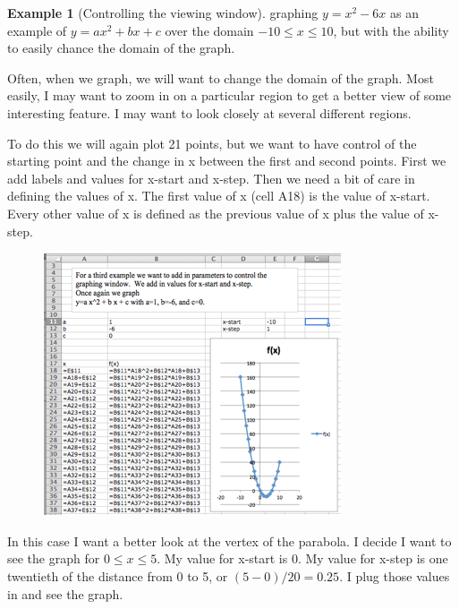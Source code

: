 \documentclass[10pt,]{book}
\theoremstyle{plain}
\theoremstyle{definition}
\newtheorem{example}[theorem]{Example}
\theoremstyle{definition}
\begin{document}
\begin{example}[Controlling the viewing window]\label{example-7}
 graphing \(y=x^2 - 6 x\) as an example of \(y = a x^2 + b x + c\) over the domain \(-10 \le x \le 10\), but with the ability to easily chance the domain of the graph.%
\par
Often, when we graph, we will want to change the domain of the graph.  Most easily, I may want to zoom in on a particular region to get a better view of some interesting feature.  I may want to look closely at several different regions.%
\par
To do this we will again plot 21 points, but we want to have control of the starting point and the change in x between the first and second points.  First we add labels and values for x-start and x-step.  Then we need a bit of care in defining the values of x.  The first value of x (cell A18) is the value of x-start.  Every other value of x is defined as the previous value of x plus the value of x-step.%
\leavevmode%
\begin{figure}
\centering
\includegraphics[width=0.8\linewidth]{images/sec1-4-8.png}
\end{figure}
\par
In this case I want a better look at the vertex of the parabola.  I decide I want to see the graph for \(0 \le x \le 5\).  My value for x-start is 0.  My value for x-step is one twentieth of the distance from 0 to 5, or \((5-0)/20 = 0.25\).  I plug those values in and see the graph.%
\leavevmode%
\begin{figure}
\centering

\end{figure}
\end{example}
\end{document}
